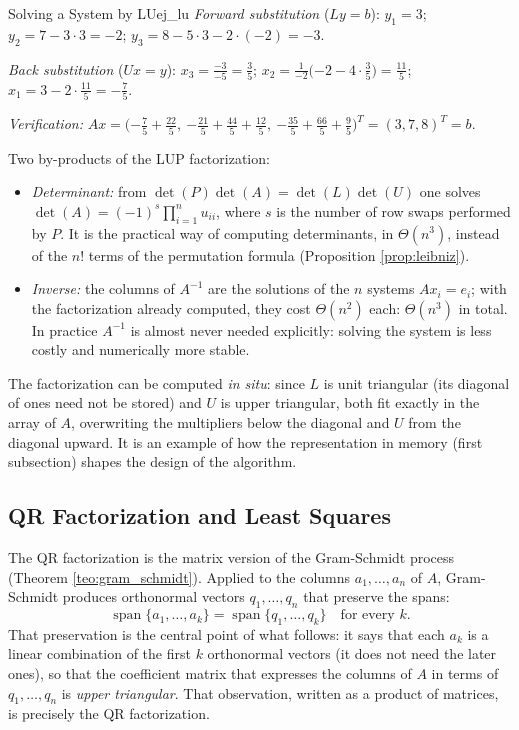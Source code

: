 \documentclass[11pt, a4paper]{article}
\begin{document}
\begin{ejemplo}{Solving a System by LU}{ej_lu}
\textit{Forward substitution} ($Ly = b$): $y_1 = 3$; $y_2 = 7 - 3 \cdot 3 = -2$; $y_3 = 8 - 5 \cdot 3 - 2 \cdot (-2) = -3$.

\textit{Back substitution} ($Ux = y$): $x_3 = \frac{-3}{-5} = \frac{3}{5}$; $x_2 = \frac{1}{-2} \big( {-2} - 4 \cdot \frac{3}{5} \big) = \frac{11}{5}$; $x_1 = 3 - 2 \cdot \frac{11}{5} = -\frac{7}{5}$.

\textit{Verification:} $A x = \big( {-\frac{7}{5}} + \frac{22}{5}, \ {-\frac{21}{5}} + \frac{44}{5} + \frac{12}{5}, \ {-\frac{35}{5}} + \frac{66}{5} + \frac{9}{5} \big)^T = (3, 7, 8)^T = b$.
\end{ejemplo}

\obs Two by-products of the LUP factorization:
\begin{itemize}
    \item \textit{Determinant:} from $\det(P) \det(A) = \det(L) \det(U)$ one solves $\det(A) = (-1)^s \prod_{i=1}^n u_{ii}$, where $s$ is the number of row swaps performed by $P$. It is the practical way of computing determinants, in $\Theta(n^3)$, instead of the $n!$ terms of the permutation formula (Proposition \ref{prop:leibniz}).
    \item \textit{Inverse:} the columns of $A^{-1}$ are the solutions of the $n$ systems $A x_i = e_i$; with the factorization already computed, they cost $\Theta(n^2)$ each: $\Theta(n^3)$ in total. In practice $A^{-1}$ is almost never needed explicitly: solving the system is less costly and numerically more stable.
\end{itemize}

\obs The factorization can be computed \emph{in situ}: since $L$ is unit triangular (its diagonal of ones need not be stored) and $U$ is upper triangular, both fit exactly in the array of $A$, overwriting the multipliers below the diagonal and $U$ from the diagonal upward. It is an example of how the representation in memory (first subsection) shapes the design of the algorithm.

\subsection{QR Factorization and Least Squares}

The QR factorization is the matrix version of the Gram-Schmidt process (Theorem \ref{teo:gram_schmidt}). Applied to the columns $a_1, \dots, a_n$ of $A$, Gram-Schmidt produces orthonormal vectors $q_1, \dots, q_n$ that preserve the spans:
\[
\operatorname{span}\{a_1, \dots, a_k\} = \operatorname{span}\{q_1, \dots, q_k\} \quad \text{for every } k.
\]
That preservation is the central point of what follows: it says that each $a_k$ is a linear combination of the first $k$ orthonormal vectors (it does not need the later ones), so that the coefficient matrix that expresses the columns of $A$ in terms of $q_1, \dots, q_n$ is \emph{upper triangular}. That observation, written as a product of matrices, is precisely the QR factorization.
\end{document}
